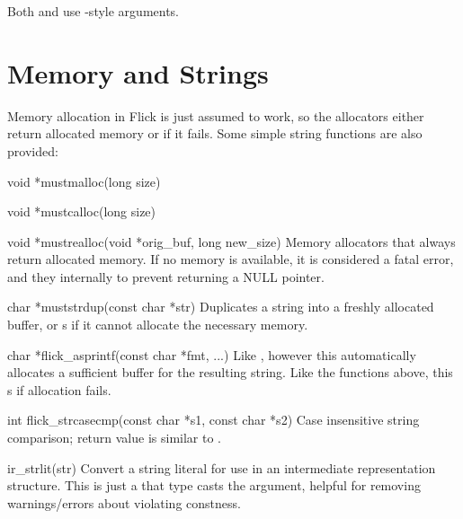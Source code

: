 Both  and  use -style
arguments.



\section{Memory and Strings}
\label{sec:libcompiler:Memory and Strings}

Memory allocation in Flick is just assumed to work, so the 
allocators either return allocated memory or  if it fails.
Some simple string functions are also provided:

\begin{cprototypelist}
  \item[void *mustmalloc(long size)]
  \item[void *mustcalloc(long size)]
  \item[void *mustrealloc(void *orig_buf, long new_size)]
  Memory allocators that always return allocated memory.  If no memory is
  available, it is considered a fatal error, and they internally
   to prevent returning a NULL pointer.

  \item[char *muststrdup(const char *str)] Duplicates a string into a freshly
  allocated buffer, or s if it cannot allocate the necessary
  memory.

  \item[char *flick_asprintf(const char *fmt, ...)] Like ,
  however this automatically allocates a sufficient buffer for the resulting
  string.  Like the functions above, this s if allocation
  fails.

  \item[int flick_strcasecmp(const char *s1, const char *s2)] Case
  insensitive string comparison; return value is similar to .

  \item[ir_strlit(str)] Convert a string literal for use in an
  intermediate representation structure.  This is just a 
  that type casts the argument, helpful for removing warnings/errors about
  violating constness.
\end{cprototypelist}



